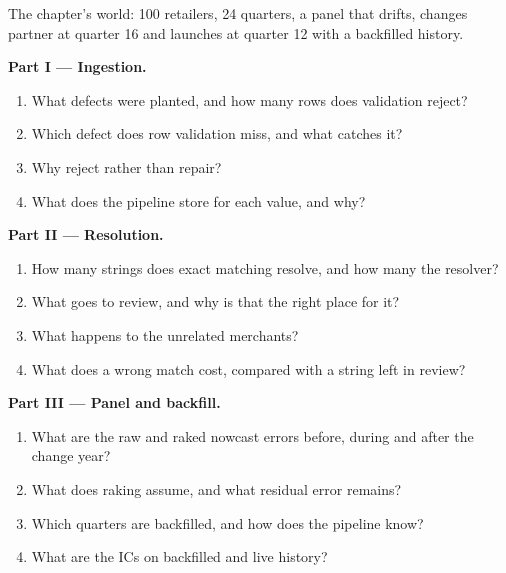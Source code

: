 \begin{problem}\label{pb:ml:alternative-data-pipelines:1}
The chapter's world: 100 retailers, 24 quarters, a panel that drifts, changes partner at quarter 16 and launches at quarter
12 with a backfilled history.

\medskip\noindent\textbf{Part I --- Ingestion.}
\begin{enumerate}
\item What defects were planted, and how many rows does validation reject?
\item Which defect does row validation miss, and what catches it?
\item Why reject rather than repair?
\item What does the pipeline store for each value, and why?
\end{enumerate}

\medskip\noindent\textbf{Part II --- Resolution.}
\begin{enumerate}[resume]
\item How many strings does exact matching resolve, and how many the resolver?
\item What goes to review, and why is that the right place for it?
\item What happens to the unrelated merchants?
\item What does a wrong match cost, compared with a string left in review?
\end{enumerate}

\medskip\noindent\textbf{Part III --- Panel and backfill.}
\begin{enumerate}[resume]
\item What are the raw and raked nowcast errors before, during and after the change year?
\item What does raking assume, and what residual error remains?
\item Which quarters are backfilled, and how does the pipeline know?
\item What are the ICs on backfilled and live history?
\end{enumerate}


\end{problem}
